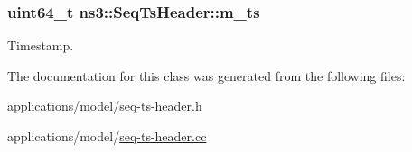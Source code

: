 \subsubsection[{\texorpdfstring{m\+\_\+ts}{m_ts}}]{\setlength{\rightskip}{0pt plus 5cm}uint64\+\_\+t ns3\+::\+Seq\+Ts\+Header\+::m\+\_\+ts\hspace{0.3cm}{\ttfamily [private]}}\hypertarget{classns3_1_1SeqTsHeader_a19c9ed228266ee535971312298dfe92c}{}\label{classns3_1_1SeqTsHeader_a19c9ed228266ee535971312298dfe92c}


Timestamp. 



The documentation for this class was generated from the following files\+:\begin{DoxyCompactItemize}
\item 
applications/model/\hyperlink{seq-ts-header_8h}{seq-\/ts-\/header.\+h}\item 
applications/model/\hyperlink{seq-ts-header_8cc}{seq-\/ts-\/header.\+cc}\end{DoxyCompactItemize}
